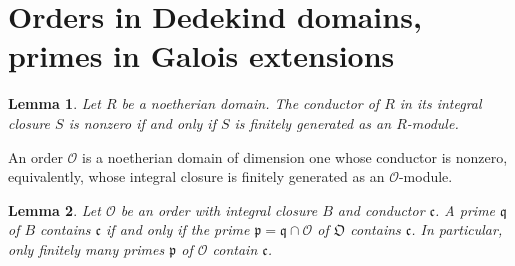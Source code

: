\documentclass[a4paper]{book}
\theoremstyle{break}
\theoremstyle{plain}
\newtheorem{lemma}{Lemma}[definition]
\begin{document}
\section{Orders in Dedekind domains, primes in Galois extensions}

\begin{lemma}
    Let \(R\) be a noetherian domain. The conductor of \(R\) in its integral closure \(S\) is nonzero if and only if \(S\) is finitely generated as an \(R\)-module.
\end{lemma}

\begin{definition}[Order]
    An order \(\mathcal{O}\) is a noetherian domain of dimension one whose conductor is nonzero, equivalently, whose integral closure is finitely generated as an \(\mathcal{O}\)-module.
\end{definition}

\begin{lemma}
    Let \(\mathcal{O}\) be an order with integral closure \(B\) and conductor \(\mathfrak{c}\). A prime \(\mathfrak{q}\) of \(B\) contains \(\mathfrak{c}\) if and only if the prime \(\mathfrak{p} = \mathfrak{q} \cap \mathcal{O}\) of \(\mathfrak{O}\) contains \(\mathfrak{c}\). In particular, only finitely many primes \(\mathfrak{p}\) of \(\mathcal{O}\) contain \(\mathfrak{c}\).
\end{lemma}
\end{document}
